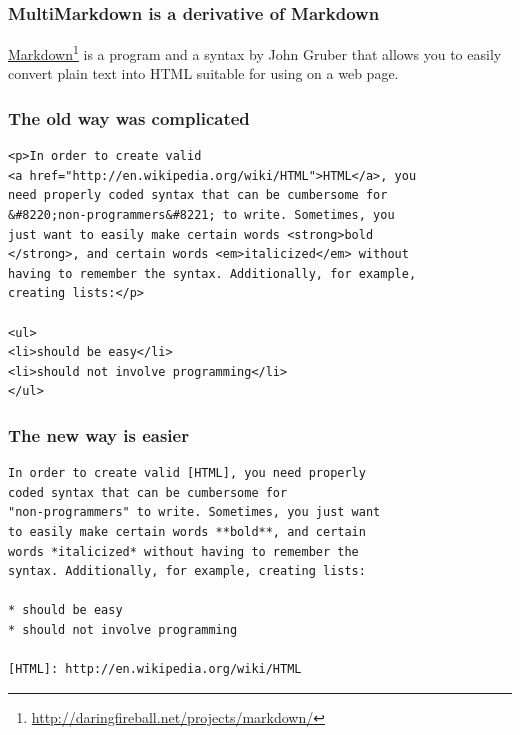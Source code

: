 
\def\mytitle{What is MultiMarkdown?}
\def\subtitle{And why should you care?}
\def\myauthor{Fletcher T. Penney}
\def\affiliation{http:/\slash fletcherpenney.net\slash multimarkdown\slash }
\def\mycopyright{2009-2011 Fletcher T. Penney.  \\
This work is licensed under a Creative Commons License.  \\
http:/\slash creativecommons.org\slash licenses\slash by-sa\slash 2.5\slash }
\def\latexmode{beamer}

\def\theme{keynote-gradient}

\begin{frame}

\frametitle{MultiMarkdown is a derivative of Markdown}
\label{multimarkdownisaderivativeofmarkdown}

\href{http://daringfireball.net/projects/markdown/}{Markdown}\footnote{\href{http://daringfireball.net/projects/markdown/}{http:/\slash daringfireball.net\slash projects\slash markdown\slash }} is a program and a
syntax by John Gruber that allows you to easily convert plain text into HTML
suitable for using on a web page.

\end{frame}

\begin{frame}[fragile]

\frametitle{The old way was complicated}
\label{theoldwaywascomplicated}

\begin{verbatim}
<p>In order to create valid 
<a href="http://en.wikipedia.org/wiki/HTML">HTML</a>, you 
need properly coded syntax that can be cumbersome for 
&#8220;non-programmers&#8221; to write. Sometimes, you
just want to easily make certain words <strong>bold
</strong>, and certain words <em>italicized</em> without
having to remember the syntax. Additionally, for example,
creating lists:</p>

<ul>
<li>should be easy</li>
<li>should not involve programming</li>
</ul>
\end{verbatim}


\end{frame}

\begin{frame}[fragile]

\frametitle{The new way is easier}
\label{thenewwayiseasier}

\begin{verbatim}
In order to create valid [HTML], you need properly
coded syntax that can be cumbersome for 
"non-programmers" to write. Sometimes, you just want
to easily make certain words **bold**, and certain 
words *italicized* without having to remember the 
syntax. Additionally, for example, creating lists:

* should be easy
* should not involve programming

[HTML]: http://en.wikipedia.org/wiki/HTML
\end{verbatim}


\end{frame}

